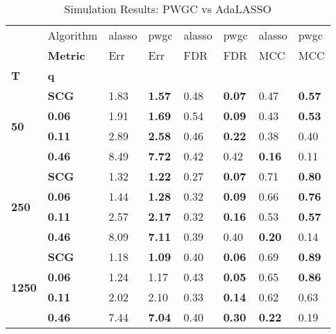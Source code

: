 \documentclass[12pt]{article}
\begin{document}
\begin{table}
  \centering
  \caption{Simulation Results: PWGC vs AdaLASSO}
  \label{taab:simulation_table}

  \begin{tabular}{|ll||ll|ll|ll|}
    \toprule
    &{Algorithm}&alasso&pwgc&alasso&pwgc&alasso&pwgc\\
    &\textbf{Metric}&Err&Err&FDR&FDR&MCC&MCC\\
    \textbf{T}&\textbf{q}&&&&&&\\
    \midrule
    \multirow{4}{*}{\textbf{50}}
    &\textbf{SCG}&1.83&\textbf{1.57}&0.48&\textbf{0.07}&0.47&\textbf{0.57}\\
    &\textbf{0.06}&1.91&\textbf{1.69}&0.54&\textbf{0.09}&0.43&\textbf{0.53}\\
    &\textbf{0.11}&2.89&\textbf{2.58}&0.46&\textbf{0.22}&0.38&0.40\\
    &\textbf{0.46}&8.49&\textbf{7.72}&0.42&0.42&\textbf{0.16}&0.11\\
    \midrule
    \multirow{4}{*}{\textbf{250}}
    &\textbf{SCG}&1.32&\textbf{1.22}&0.27&\textbf{0.07}&0.71&\textbf{0.80}\\
    &\textbf{0.06}&1.44&\textbf{1.28}&0.32&\textbf{0.09}&0.66&\textbf{0.76}\\
    &\textbf{0.11}&2.57&\textbf{2.17}&0.32&\textbf{0.16}&0.53&\textbf{0.57}\\
    &\textbf{0.46}&8.09&\textbf{7.11}&0.39&0.40&\textbf{0.20}&0.14\\
    \midrule
    \multirow{4}{*}{\textbf{1250}}
    &\textbf{SCG}&1.18&\textbf{1.09}&0.40&\textbf{0.06}&0.69&\textbf{0.89}\\
    &\textbf{0.06}&1.24&1.17&0.43&\textbf{0.05}&0.65&\textbf{0.86}\\
    &\textbf{0.11}&2.02&2.10&0.33&\textbf{0.14}&0.62&0.63\\
    &\textbf{0.46}&7.44&\textbf{7.04}&0.40&\textbf{0.30}&\textbf{0.22}&0.19\\
    \bottomrule
  \end{tabular}


\end{table}
\end{document}
